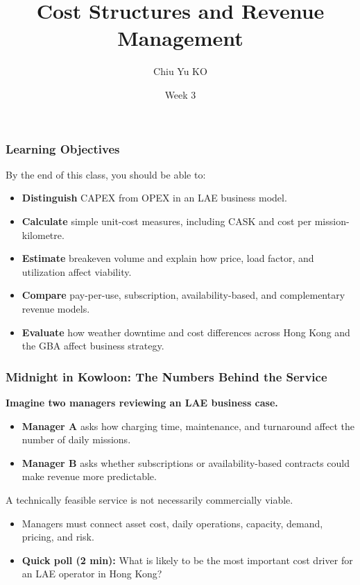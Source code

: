\documentclass{beamer}
\begin{document}

\begin{frame}
  \title{Cost Structures and Revenue Management}
  \author{Chiu Yu KO}
  \date{Week 3}
  \titlepage
\end{frame}

\begin{frame}[t]
  \frametitle{Learning Objectives}
  By the end of this class, you should be able to:
  \begin{itemize}
    \item \textbf{Distinguish} CAPEX from OPEX in an LAE business model.
    \item \textbf{Calculate} simple unit-cost measures, including CASK and cost per mission-kilometre.
    \item \textbf{Estimate} breakeven volume and explain how price, load factor, and utilization affect viability.
    \item \textbf{Compare} pay-per-use, subscription, availability-based, and complementary revenue models.
    \item \textbf{Evaluate} how weather downtime and cost differences across Hong Kong and the GBA affect business strategy.
  \end{itemize}
\end{frame}

\begin{frame}[t]
  \frametitle{Midnight in Kowloon: The Numbers Behind the Service}
  \textbf{Imagine two managers reviewing an LAE business case.}
  \begin{itemize}
    \item \textbf{Manager A} asks how charging time, maintenance, and turnaround affect the number of daily missions.
    \item \textbf{Manager B} asks whether subscriptions or availability-based contracts could make revenue more predictable.
  \end{itemize}
  \vspace{0.3cm}
  A technically feasible service is not necessarily commercially viable.
  \begin{itemize}
    \item Managers must connect asset cost, daily operations, capacity, demand, pricing, and risk.
    \item \textbf{Quick poll (2 min):} What is likely to be the most important cost driver for an LAE operator in Hong Kong?
  \end{itemize}
\end{frame}
\end{document}
